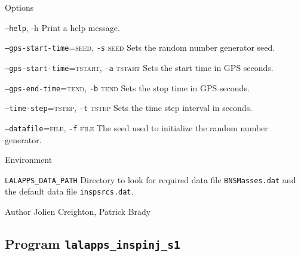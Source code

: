 \begin{entry}
\item[Options]\leavevmode
\begin{entry}
\item[\texttt{--help}, -h] Print a help message.

\item[\texttt{--gps-start-time}=\textsc{seed}, \texttt{-s} \textsc{seed}]
Sets the random number generator seed.

\item[\texttt{--gps-start-time}=\textsc{tstart}, \texttt{-a} \textsc{tstart}]
Sets the start time in GPS seconds.

\item[\texttt{--gps-end-time}=\textsc{tend}, \texttt{-b} \textsc{tend}]
Sets the stop time in GPS seconds.

\item[\texttt{--time-step}=\textsc{tstep}, \texttt{-t} \textsc{tstep}]
Sets the time step interval in seconds.

\item[\texttt{--datafile}=\textsc{file}, \texttt{-f} \textsc{file}]
The seed used to initialize the random number generator.
\end{entry}

\item[Environment]\leavevmode

\begin{entry}
\item[\texttt{LALAPPS\_DATA\_PATH}]
Directory to look for required data file \verb+BNSMasses.dat+ and the
default data file \verb+inspsrcs.dat+.
\end{entry}

\item[Author] 
Jolien Creighton, Patrick Brady
\end{entry}



\clearpage
\subsection{Program \texttt{lalapps\_inspinj\_s1}}
\label{program:lalapps-inspinj-s1}

